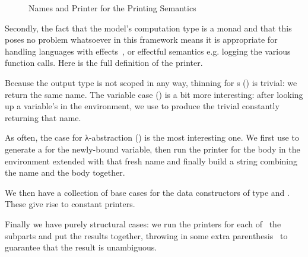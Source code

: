 \begin{figure}[h]
\begin{minipage}{0.5\textwidth}
\end{minipage}
\begin{minipage}{0.5\textwidth}
\end{minipage}
\caption{Names and Printer for the Printing Semantics\label{fig:semprint}}
\end{figure}

Secondly, the fact that the model's computation type is a monad and that this
poses no problem whatsoever in this framework means it is appropriate for
handling languages with effects~\cite{moggi1991notions}, or effectful
semantics e.g. logging the various function calls. Here is the full definition
of the printer.


Because the output type is not scoped in any way, thinning for s
() is trivial: we return the same name. The variable
case () is a bit more interesting: after looking up a variable's 
in the environment, we use  to produce the trivial  constantly
returning that name.


As often, the case for λ-abstraction () is the most interesting one.
We first use  to generate a  for the newly-bound variable,
then run the printer for the body in the environment extended with that fresh
name and finally build a string combining the name and the body together.


We then have a collection of base cases for the data constructors of type
 and . These give rise to constant printers.


Finally we have purely structural cases: we run the printers for each of~
the subparts and put the results together, throwing in some extra parenthesis~
to guarantee that the result is unambiguous.

